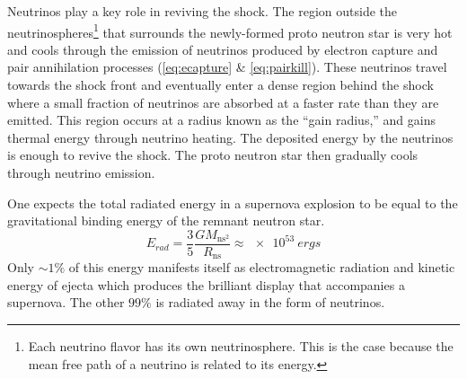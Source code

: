 		Neutrinos play a key role in reviving the shock. The region outside the neutrinospheres\footnote{Each neutrino flavor has its own neutrinosphere. This is the case because the mean free path of a neutrino is related to its energy.} that surrounds the newly-formed proto neutron star is very hot and cools through the emission of neutrinos produced by electron capture and pair annihilation processes (\EQS \ref{eq:ecapture} \& \ref{eq:pairkill}). These neutrinos travel towards the shock front and eventually enter a dense region behind the shock where a small fraction of neutrinos are absorbed at a faster rate than they are emitted. This region occurs at a radius known as the ``gain radius,'' and gains thermal energy through neutrino heating. The deposited energy by the neutrinos is enough to revive the shock. The proto neutron star then gradually cools through neutrino emission.

		One expects the total radiated energy in a supernova explosion to be equal to the gravitational binding energy of the remnant neutron star. 
		\begin{equation}
			E_{rad} = \frac{3}{5} \frac{G M_{\text{ns}^2}}{R_{\text{ns}}} \approx \SI[mode=text]{e53}{ergs}
		\end{equation}
		Only $\sim 1\%$ of this energy manifests itself as electromagnetic radiation and kinetic energy of ejecta which produces the brilliant display that accompanies a supernova. The other $99\%$ is radiated away in the form of neutrinos.


